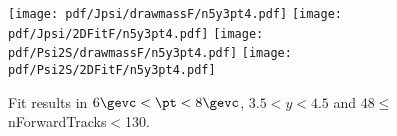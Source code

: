 \begin{figure}[H]
\begin{center}
\texttt{[image: pdf/Jpsi/drawmassF/n5y3pt4.pdf]}
\texttt{[image: pdf/Jpsi/2DFitF/n5y3pt4.pdf]}
\vspace*{-0.5cm}
\texttt{[image: pdf/Psi2S/drawmassF/n5y3pt4.pdf]}
\texttt{[image: pdf/Psi2S/2DFitF/n5y3pt4.pdf]}
\vspace*{-0.5cm}
\end{center}
\caption{Fit results in $6\gevc<\pt<8\gevc$, $3.5<y<4.5$ and 48$\leq$nForwardTracks$<$130.}
\label{Fitn5y3pt4}
\end{figure}
